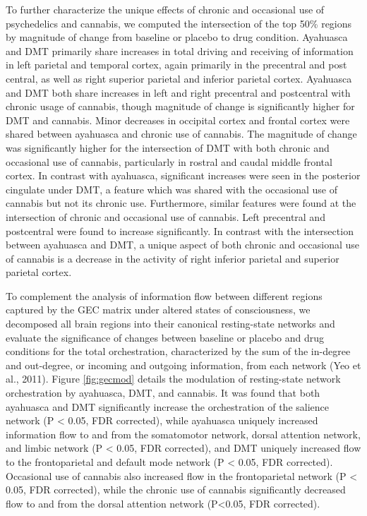 To further characterize the unique effects of chronic and occasional use
of psychedelics and cannabis, we computed the intersection of the top
50\% regions by magnitude of change from baseline or placebo to drug
condition. Ayahuasca and DMT primarily share increases in total driving
and receiving of information in left parietal and temporal cortex, again
primarily in the precentral and post central, as well as right superior
parietal and inferior parietal cortex. Ayahuasca and DMT both share
increases in left and right precentral and postcentral with chronic
usage of cannabis, though magnitude of change is significantly higher
for DMT and cannabis. Minor decreases in occipital cortex and frontal
cortex were shared between ayahuasca and chronic use of cannabis. The
magnitude of change was significantly higher for the intersection of DMT
with both chronic and occasional use of cannabis, particularly in
rostral and caudal middle frontal cortex. In contrast with ayahuasca,
significant increases were seen in the posterior cingulate under DMT, a
feature which was shared with the occasional use of cannabis but not its
chronic use. Furthermore, similar features were found at the
intersection of chronic and occasional use of cannabis. Left precentral
and postcentral were found to increase significantly. In contrast with
the intersection between ayahuasca and DMT, a unique aspect of both
chronic and occasional use of cannabis is a decrease in the activity of
right inferior parietal and superior parietal cortex.

To complement the analysis of information flow between different regions
captured by the GEC matrix under altered states of consciousness, we
decomposed all brain regions into their canonical resting-state networks
and evaluate the significance of changes between baseline or placebo and
drug conditions for the total orchestration, characterized by the sum of
the in-degree and out-degree, or incoming and outgoing information, from
each network (Yeo et al., 2011). Figure \ref{fig:gecmod} details the modulation of
resting-state network orchestration by ayahuasca, DMT, and cannabis. It
was found that both ayahuasca and DMT significantly increase the
orchestration of the salience network (P \textless{} 0.05, FDR
corrected), while ayahuasca uniquely increased information flow to and
from the somatomotor network, dorsal attention network, and limbic
network (P \textless{} 0.05, FDR corrected), and DMT uniquely increased
flow to the frontoparietal and default mode network (P \textless{} 0.05,
FDR corrected). Occasional use of cannabis also increased flow in the
frontoparietal network (P \textless{} 0.05, FDR corrected), while the
chronic use of cannabis significantly decreased flow to and from the
dorsal attention network (P\textless0.05, FDR corrected).

